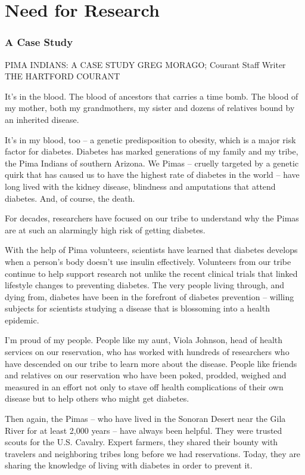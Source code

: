 \documentclass[12pt]{article}
\begin{document}
\newpage
\part{Need for Research}

\section{A Case Study}
\iffalse https://www.courant.com/news/connecticut/hc-xpm-2001-09-18-0109180410-story.html \fi

PIMA INDIANS: A CASE STUDY
GREG MORAGO; Courant Staff Writer
THE HARTFORD COURANT

It's in the blood. The blood of ancestors that carries a time bomb. The blood of my mother, both my grandmothers, my sister and dozens of relatives bound by an inherited disease.

It's in my blood, too -- a genetic predisposition to obesity, which is a major risk factor for diabetes. Diabetes has marked generations of my family and my tribe, the Pima Indians of southern Arizona. We Pimas -- cruelly targeted by a genetic quirk that has caused us to have the highest rate of diabetes in the world -- have long lived with the kidney disease, blindness and amputations that attend diabetes. And, of course, the death.

For decades, researchers have focused on our tribe to understand why the Pimas are at such an alarmingly high risk of getting diabetes.

With the help of Pima volunteers, scientists have learned that diabetes develops when a person's body doesn't use insulin effectively. Volunteers from our tribe continue to help support research not unlike the recent clinical trials that linked lifestyle changes to preventing diabetes. The very people living through, and dying from, diabetes have been in the forefront of diabetes prevention -- willing subjects for scientists studying a disease that is blossoming into a health epidemic.

I'm proud of my people. People like my aunt, Viola Johnson, head of health services on our reservation, who has worked with hundreds of researchers who have descended on our tribe to learn more about the disease. People like friends and relatives on our reservation who have been poked, prodded, weighed and measured in an effort not only to stave off health complications of their own disease but to help others who might get diabetes.

Then again, the Pimas -- who have lived in the Sonoran Desert near the Gila River for at least 2,000 years -- have always been helpful. They were trusted scouts for the U.S. Cavalry. Expert farmers, they shared their bounty with travelers and neighboring tribes long before we had reservations. Today, they are sharing the knowledge of living with diabetes in order to prevent it.
\end{document}
